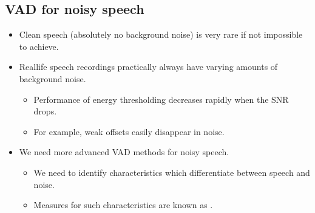 \documentclass[letterpaper,10pt,english]{jupyterBook}
\begin{document}
\subsection{VAD for noisy speech}
\label{\detokenize{Recognition/Voice_activity_detection:vad-for-noisy-speech}}\begin{itemize}
\item {} 
\sphinxAtStartPar
Clean speech (absolutely no background noise) is very rare if not
impossible to achieve.

\item {} 
\sphinxAtStartPar
Real\sphinxhyphen{}life speech recordings practically always have varying amounts
of background noise.
\begin{itemize}
\item {} 
\sphinxAtStartPar
Performance of energy thresholding decreases rapidly when the
SNR drops.

\item {} 
\sphinxAtStartPar
For example, weak offsets easily disappear in noise.

\end{itemize}

\item {} 
\sphinxAtStartPar
We need more advanced VAD methods for noisy speech.
\begin{itemize}
\item {} 
\sphinxAtStartPar
We need to identify characteristics which differentiate between
speech and noise.

\item {} 
\sphinxAtStartPar
Measures for such characteristics are known as .

\end{itemize}

\end{itemize}
\end{document}
